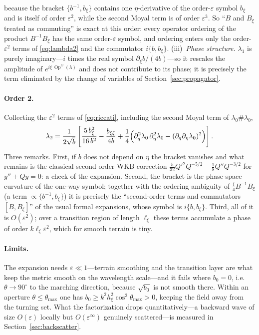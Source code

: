 \documentclass[11pt]{article}
\newcommand{\pd}{\partial}
\newcommand{\Op}{\operatorname{Op}^w}
\begin{document}
because the bracket $\{b^{-1},b_\xi\}$ contains one $\eta$-derivative of
the order-$\varepsilon$ symbol $b_\xi$ and is itself of order
$\varepsilon^2$, while the second Moyal term is of order $\varepsilon^3$.
So ``$B$ and $B_\xi$ treated as commuting'' is exact at this order: every
operator ordering of the product $B^{-1}B_\xi$ has the same
order-$\varepsilon$ symbol, and ordering enters only the
order-$\varepsilon^2$ terms of \eqref{eq:lambda2} and the commutator
$i\{b,b_\xi\}$. (iii)~\emph{Phase structure.} $\lambda_1$ is purely
imaginary---$i$ times the real symbol $\pd_\xi b/(4b)$---so it rescales the
amplitude of $e^{i\xi\,\Op(\lambda)}$ and does not contribute to its phase;
it is precisely the term eliminated by the change of variables of
Section~\ref{sec:propagator}.

\paragraph{Order 2.} Collecting the $\varepsilon^2$ terms of
\eqref{eq:riccati}, including the second Moyal term of $\lambda_0\#\lambda_0$,
\begin{equation}\label{eq:lambda2}
\lambda_2=\frac1{2\sqrt b}\left[
\frac{5\,b_\xi^2}{16\,b^2}-\frac{b_{\xi\xi}}{4b}
+\frac14\Bigl(\pd_q^2\lambda_0\,\pd_\eta^2\lambda_0
-(\pd_q\pd_\eta\lambda_0)^2\Bigr)\right].
\end{equation}
Three remarks. First, if $b$ does not depend on $\eta$ the bracket vanishes
and what remains is the classical second-order WKB correction
$\tfrac5{32}Q'^2Q^{-5/2}-\tfrac18Q''Q^{-3/2}$ for $y''+Qy=0$: a check of the
expansion. Second, the bracket is the phase-space curvature of the one-way
symbol; together with the ordering ambiguity of $\tfrac i4B^{-1}B_\xi$
(a term $\propto\{b^{-1},b_\xi\}$) it is precisely the ``second-order terms
and commutators $[B,B_\xi]$'' of the usual formal expansions, whose symbol is
$i\{b,b_\xi\}$. Third, all of it is $O(\varepsilon^2)$; over a transition
region of length $\ell_\xi$ these terms accumulate a phase of order
$k\ell_\xi\varepsilon^2$, which for smooth terrain is tiny.

\paragraph{Limits.} The expansion needs $\varepsilon\ll1$---terrain smoothing
and the transition layer are what keep the metric smooth on the wavelength
scale---and it fails where $b_0=0$, i.e.\ $\theta\to90^\circ$ to the marching
direction, because $\sqrt{b_0}$ is not smooth there. Within an aperture
$\theta\le\theta_{\max}$ one has
$b_0\ge k^2h_\xi^2\cos^2\theta_{\max}>0$, keeping the field away from the
turning set. What the factorization drops quantitatively---a backward wave of
size $O(\varepsilon)$ locally but $O(\varepsilon^\infty)$ genuinely
scattered---is measured in Section~\ref{sec:backscatter}.
\end{document}
